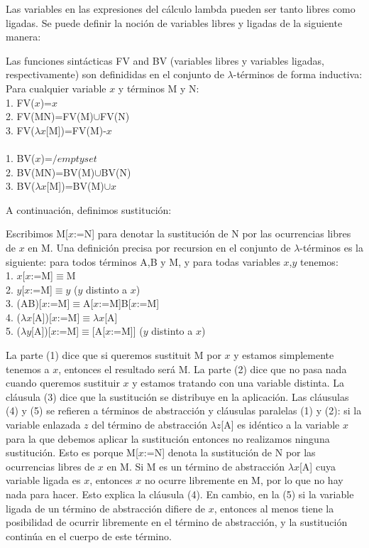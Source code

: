 Las variables en las expresiones del cálculo lambda pueden ser tanto libres como ligadas. Se puede definir la noción de variables libres y ligadas de la siguiente manera:

\begin{definition}[]
  Las funciones sintácticas FV and BV (variables libres y variables ligadas, respectivamente) son definididas en el conjunto de $\lambda$-términos de forma inductiva:\\
  Para cualquier variable $x$ y términos M y N:\\
  1. FV($x$)={$x$}\\
  2. FV(MN)=FV(M)$\cup$FV(N)\\
  3. FV($\lambda$$x$[M])=FV(M)-{$x$}\\
  \\
  1. BV($x$)={$/emptyset$}\\
  2. BV(MN)=BV(M)$\cup$BV(N)\\
  3. BV($\lambda$$x$[M])=BV(M)$\cup${$x$}\\
\end{definition}

A continuación, definimos sustitución:

\begin{definition}[Sustitución]
  Escribimos M[$x$:=N] para denotar la sustitución de N por las ocurrencias libres de $x$ en M. Una definición precisa por recursion en el conjunto de $\lambda$-términos es la siguiente: para todos términos A,B y M, y para todas variables $x$,$y$ tenemos:\\
  1. $x$[$x$:=M]$\equiv$M\\
  2. $y$[$x$:=M]$\equiv$$y$ ($y$ distinto a $x$)\\
  3. (AB)[$x$:=M]$\equiv$A[$x$:=M]B[$x$:=M]\\
  4. ($\lambda$$x$[A])[$x$:=M]$\equiv$$\lambda$$x$[A]\\
  5. ($\lambda$$y$[A])[$x$:=M]$\equiv$[A[$x$:=M]] ($y$ distinto a $x$)\\
\end{definition}

La parte (1) dice que si queremos sustituit M por $x$ y estamos simplemente tenemos a $x$, entonces el resultado será M. La parte (2) dice que no pasa nada cuando queremos sustituir $x$ y estamos tratando con una variable distinta. La cláusula (3) dice que la sustitución se distribuye en la aplicación. Las cláusulas (4) y (5) se refieren a términos de abstracción y cláusulas paralelas (1) y (2): si la variable enlazada $z$ del término de abstracción $\lambda$$z$[A] es idéntico a la variable $x$ para la que debemos aplicar la sustitución entonces no realizamos ninguna sustitución. Esto es porque M[$x$:=N] denota la sustitución de N por las ocurrencias libres de $x$ en M. Si M es un término de abstracción $\lambda$$x$[A] cuya variable ligada es $x$, entonces $x$ no ocurre libremente en M, por lo que no hay nada para hacer. Esto explica la cláusula (4). En cambio, en la (5) si la variable ligada de un término de abstracción difiere de $x$, entonces al menos tiene la posibilidad de ocurrir libremente en el término de abstracción, y la sustitución continúa en el cuerpo de este término.

